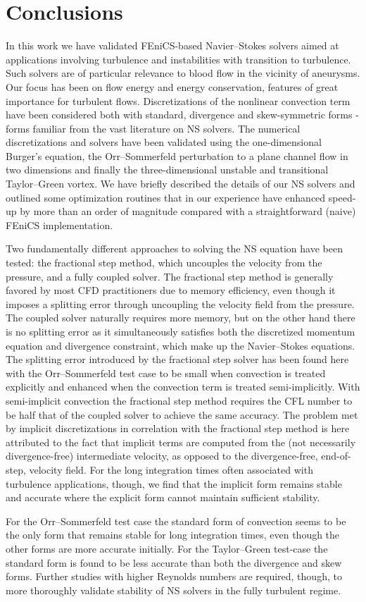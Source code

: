 \section{Conclusions}

In this work we have validated FEniCS-based Navier--Stokes solvers
aimed at applications involving turbulence and instabilities with
transition to turbulence. Such solvers are of particular relevance to
blood flow in the vicinity of aneurysms.  Our focus has been on flow
energy and energy conservation, features of great importance for
turbulent flows. Discretizations of the nonlinear convection term have
been considered both with standard, divergence and skew-symmetric
forms - forms familiar from the vast literature on NS solvers. The
numerical discretizations and solvers have been validated using the
one-dimensional Burger's equation, the Orr--Sommerfeld perturbation to
a plane channel flow in two dimensions and finally the
three-dimensional unstable and transitional Taylor--Green vortex. We
have briefly described the details of our NS solvers and outlined some
optimization routines that in our experience have enhanced speed-up by
more than an order of magnitude compared with a straightforward
(naive) FEniCS implementation.

Two fundamentally different approaches to solving the NS equation have
been tested: the fractional step method, which uncouples the velocity
from the pressure, and a fully coupled solver. The fractional step
method is generally favored by most CFD practitioners due to memory
efficiency, even though it imposes a splitting error through
uncoupling the velocity field from the pressure. The coupled solver
naturally requires more memory, but on the other hand there is no
splitting error as it simultaneously satisfies both the discretized
momentum equation and divergence constraint, which make up the
Navier--Stokes equations. The splitting error introduced by the
fractional step solver has been found here with the Orr--Sommerfeld
test case to be small when convection is treated explicitly and
enhanced when the convection term is treated semi-implicitly. With
semi-implicit convection the fractional step method requires the CFL
number to be half that of the coupled solver to achieve the same
accuracy. The problem met by implicit discretizations in correlation
with the fractional step method is here attributed to the fact that
implicit terms are computed from the (not necessarily divergence-free)
intermediate velocity, as opposed to the divergence-free, end-of-step,
velocity field. For the long integration times often associated with
turbulence applications, though, we find that the implicit form
remains stable and accurate where the explicit form cannot maintain
sufficient stability.

For the Orr--Sommerfeld test case the standard form of convection seems
to be the only form that remains stable for long integration times,
even though the other forms are more accurate initially. For the
Taylor--Green test-case the standard form is found to be less accurate
than both the divergence and skew forms. Further studies with higher
Reynolds numbers are required, though, to more thoroughly validate
stability of NS solvers in the fully turbulent regime.
